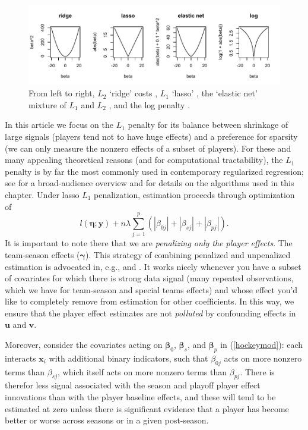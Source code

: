 \begin{figure}[t]
\includegraphics[width=\textwidth]{figures/penalties}
\caption{\label{costs} 
From left to right, 
$L_2$ `ridge' costs \cite{hoerl_ridge_1970}, $L_1$ `lasso' \cite{tibshirani_regression_1996}, the `elastic net' mixture of $L_1$ and $L_2$ \cite{zou_regularization_2005}, and the log penalty \cite{candes_enhancing_2008}.
}
\end{figure}

In this article we focus on the $L_1$ penalty for its balance between
shrinkage of large signals (players tend not to have huge effects) and a
preference for sparsity (we can only measure the nonzero effects of a subset
of players).  For these and many appealing theoretical reasons (and for
computational tractability), the $L_1$ penalty is by far the most commonly
used in contemporary regularized regression; see
\cite{hastie:tibsh:fried:2001} for a broad-audience overview and
\cite{taddy_one-step_2015} for details on the algorithms used in this chapter.
Under lasso $L_1$ penalization, estimation proceeds through optimization of
\begin{equation} \label{pendev}
l\left(\boldsymbol{\eta}; \mathbf{y}\right) + n\lambda \sum_{j=1}^p\left(|\beta_{0j}| + |\beta_{sj}| + |\beta_{pj}|\right).
\end{equation}
It is important to note there that we are \textit{penalizing only the player
effects}.  The team-season effects ($\boldsymbol{\gamma}$).  This strategy of
combining penalized and unpenalized estimation is advocated in, e.g.,
\cite{taddy_distributed_2015} and \cite{gentzkow_measuring_2015}.  It works
nicely whenever you have a subset of covariates for which there is strong data
signal (many repeated observations, which we have for team-season and special
teams effects) and whose effect you'd like to completely remove from
estimation for other coefficients.  In this way, we ensure that the player
effect estimates are not \textit{polluted} by confounding effects in
$\mathbf{u}$ and $\mathbf{v}$.  

Moreover, consider the covariates acting on $\boldsymbol{\beta}_0$,
$\boldsymbol{\beta}_s$, and $\boldsymbol{\beta}_p$ in (\ref{hockeymod}): each
interacts $\mathbf{x}_i$ with additional binary indicators, such that
$\beta_{0j}$ acts on more nonzero terms than $\beta_{sj}$, which itself acts
on more nonzero terms than $\beta_{pj}$.  There is therefor less signal
associated with the season and playoff player effect innovations than with the
player baseline effects, and these will tend to be estimated at zero unless
there is significant evidence that a player has become better or worse across
seasons or in a given post-season.

